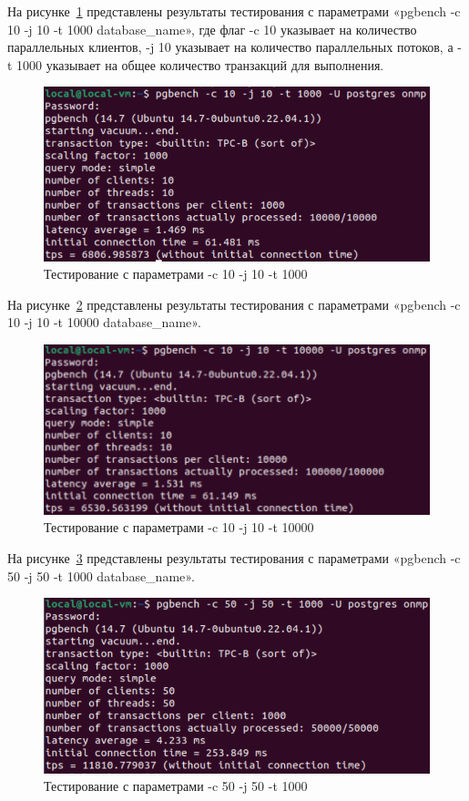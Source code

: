 На рисунке~\ref{fig:b4} представлены результаты тестирования с параметрами «pgbench -c 10 -j 10 -t 1000 database\_name», где флаг -c 10 указывает на количество параллельных клиентов, -j 10 указывает на количество параллельных потоков, а -t 1000 указывает на общее количество транзакций для выполнения.

\begin{figure}
    \includegraphics[width=16.5cm]{inc/test1_4}
    \caption{Тестирование с параметрами -c 10 -j 10 -t 1000}
    \label{fig:b4}
\end{figure}

На рисунке~\ref{fig:b5} представлены результаты тестирования с параметрами «pgbench -c 10 -j 10 -t 10000 database\_name».

\begin{figure}
    \includegraphics[width=16.5cm]{inc/test1_5}
    \caption{Тестирование с параметрами -c 10 -j 10 -t 10000}
    \label{fig:b5}
\end{figure}

На рисунке~\ref{fig:b6} представлены результаты тестирования с параметрами «pgbench -c 50 -j 50 -t 1000 database\_name».

\begin{figure}
    \includegraphics[width=16.5cm]{inc/test1_6}
    \caption{Тестирование с параметрами -c 50 -j 50 -t 1000}
    \label{fig:b6}
\end{figure}

